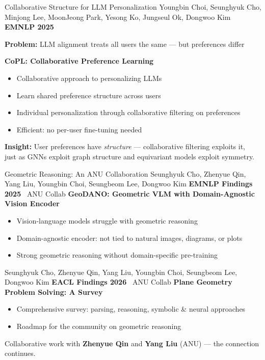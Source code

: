 \documentclass[aspectratio=169,11pt]{beamer}
\newcommand{\papercite}[1]{{\scriptsize\color{mutedText}#1}}
\newcommand{\venue}[1]{{\small\textcolor{postechBlue}{\textbf{#1}}}}
\newcommand{\anucollab}{\faHandshake~\textcolor{anuGold}{\scriptsize ANU Collab}}
\begin{document}
\begin{frame}{Collaborative Structure for LLM Personalization}
  \papercite{Youngbin Choi, Seunghyuk Cho, Minjong Lee, MoonJeong Park, Yesong Ko, Jungseul Ok, Dongwoo Kim \hfill \venue{EMNLP 2025}}
  \vspace{8pt}

  \textbf{Problem:} LLM alignment treats all users the same --- but preferences differ
  \vspace{6pt}

  \textbf{CoPL: Collaborative Preference Learning}
  \begin{itemize}
    \item \alert{Collaborative} approach to personalizing LLMs
    \item Learn shared preference structure across users
    \item Individual personalization through collaborative filtering on preferences
    \item Efficient: no per-user fine-tuning needed
  \end{itemize}
  \vspace{8pt}

  \textbf{Insight:} User preferences have \textit{structure} --- collaborative filtering exploits it,\\
  {\small just as GNNs exploit graph structure and equivariant models exploit symmetry.}
\end{frame}

\begin{frame}{Geometric Reasoning: An ANU Collaboration}
  \papercite{Seunghyuk Cho, Zhenyue Qin, Yang Liu, Youngbin Choi, Seungbeom Lee, Dongwoo Kim \hfill \venue{EMNLP Findings 2025} \anucollab}
  \vspace{4pt}
  \textbf{GeoDANO: Geometric VLM with Domain-Agnostic Vision Encoder}
  \begin{itemize}
    \item Vision-language models struggle with \alert{geometric reasoning}
    \item Domain-agnostic encoder: not tied to natural images, diagrams, or plots
    \item Strong geometric reasoning without domain-specific pre-training
  \end{itemize}

  \vspace{8pt}

  \papercite{Seunghyuk Cho, Zhenyue Qin, Yang Liu, Youngbin Choi, Seungbeom Lee, Dongwoo Kim \hfill \venue{EACL Findings 2026} \anucollab}
  \vspace{4pt}
  \textbf{Plane Geometry Problem Solving: A Survey}
  \begin{itemize}
    \item Comprehensive survey: parsing, reasoning, symbolic \& neural approaches
    \item Roadmap for the community on geometric reasoning
  \end{itemize}
  \vspace{4pt}
  {\small Collaborative work with \textbf{Zhenyue Qin} and \textbf{Yang Liu} (ANU) --- the connection continues.}
\end{frame}
\end{document}
